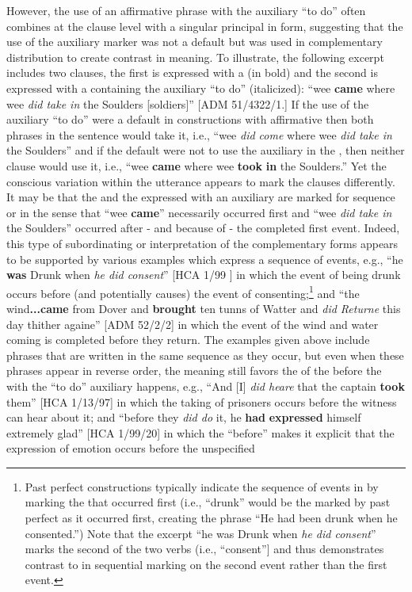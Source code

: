 However, the use of an affirmative  phrase with the auxiliary “to do” often combines at the clause level with a singular principal  in  form, suggesting that the use of the auxiliary marker was not a default but was used in complementary distribution to create contrast in meaning. To illustrate, the following excerpt includes two clauses, the first is expressed with a   (in bold) and the second is expressed with a  containing the auxiliary “to do” (italicized): “wee \textbf{came} where wee \textit{did take in} the Soulders [soldiers]” [ADM 51/4322/1.] If the use of the auxiliary “to do” were a default in constructions with affirmative  then both  phrases in the sentence would take it, i.e., “wee \textit{did come} where wee \textit{did take in} the Soulders” and if the default were not to use the auxiliary in the , then neither clause would use it, i.e., “wee \textbf{came} where wee \textbf{took} \textbf{in} the Soulders.” Yet the conscious variation within the utterance appears to mark the clauses differently. It may be that the  and the  expressed with an auxiliary are marked for sequence or  in the sense that “wee \textbf{came}” necessarily occurred first and “wee \textit{did take in} the Soulders” occurred after - and because of - the completed first event. Indeed, this type of subordinating or  interpretation of the complementary  forms appears to be supported by various examples which express a sequence of events, e.g., “he \textbf{was} Drunk when \textit{he did consent}” [HCA 1/99  \citealt{Islands1722}] in which the event of being drunk occurs before (and potentially causes) the event of consenting;\footnote{Past perfect constructions typically indicate the sequence of events in  by marking the  that occurred first (i.e., “drunk” would be the  marked by past perfect as it occurred first, creating the phrase “He had been drunk when he consented.”) Note that the excerpt “he was Drunk when \textit{he did consent}” marks the second of the two verbs (i.e., “consent”] and thus demonstrates contrast to  in sequential marking on the second event rather than the first event.}  and “the wind\textbf{...came} from Dover and \textbf{brought} ten tunns of Watter and \textit{did Returne} this day thither againe” [ADM 52/2/2] in which the event of the wind and water coming is completed before they return. The examples given above include  phrases that are written in the same sequence as they occur, but even when these  phrases appear in reverse order, the meaning still favors the  of the   before the  with the “to do” auxiliary happens, e.g., “And [I] \textit{did heare} that the captain \textbf{took} them” [HCA 1/13/97] in which the taking of prisoners occurs before the witness can hear about it; and “before they \textit{did do} it, he \textbf{had} \textbf{expressed} himself extremely glad” [HCA 1/99/20] in which the  “before” makes it explicit that the expression of emotion occurs before the unspecified 